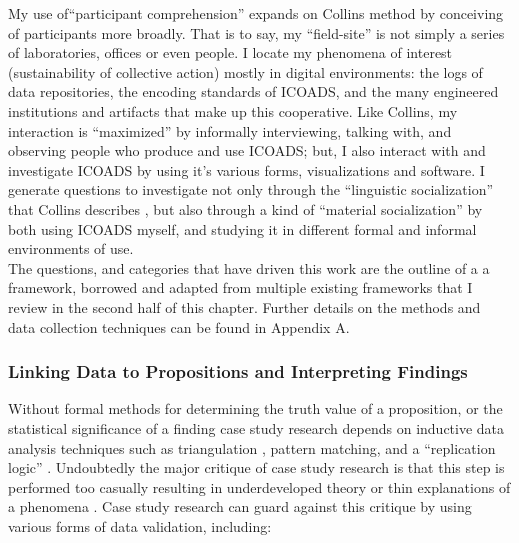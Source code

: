 \documentclass[thesis,tocnosub,noragright,centerchapter,12pt]{uiucecethesis09}
\begin{document}
{My use of``participant comprehension'' expands on
Collins method by conceiving of participants more broadly. That is to
say, my ``field-site'' is not simply a series of laboratories, offices
or even people. I locate my phenomena of interest (sustainability of
collective action) mostly in digital environments: the logs of data
repositories, the encoding standards of ICOADS, and the many engineered
institutions and artifacts that make up this cooperative. Like Collins,
my interaction is ``maximized'' by informally interviewing, talking
with, and observing people who produce and use ICOADS; but, I also
interact with and investigate ICOADS by using it's various forms,
visualizations and software. I generate questions to investigate not only through the ``linguistic socialization'' that Collins describes \citep{collins1998meaning}, but also through a kind of ``material socialization'' by both using ICOADS myself, and studying it in different formal and informal environments of
use.\\

The questions, and categories that have driven this work are the outline of a
a framework, borrowed and adapted from multiple existing frameworks that
I review in the second half of this chapter. Further details on the
methods and data collection techniques can be found in Appendix A.\\

\subsubsection*{Linking Data to Propositions and Interpreting Findings}

Without formal methods for determining the truth value of a proposition, or the statistical significance
of a finding case study research depends on inductive data analysis techniques such as triangulation \citep[p. 133]{denzin2008strategies}, pattern matching, and a ``replication logic''
\citep{eisenhardt2007theory}. Undoubtedly the major critique of case study
research is that this step is performed too casually resulting in
underdeveloped theory or thin explanations of a phenomena \citep{flyvbjerg2006five}.
Case study research can guard against this critique by using various
forms of data validation, including:\\

}
\end{document}
